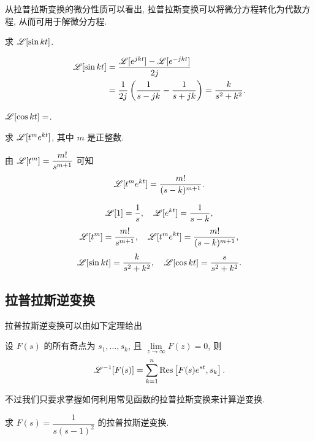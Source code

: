 \documentclass[nocolor,theme=doremi,lang=cn,11pt,chinese,twoside,openright,usesamecnt]{elegantbook}
\newenvironment{block}[1]{\begin{tcolorbox}[blockstyle,title=#1]}{\end{tcolorbox}}
\newenvironment{alertblock}[1]{\begin{tcolorbox}[alertstyle,title=#1]}{\end{tcolorbox}}
\begin{document}
从拉普拉斯变换的微分性质可以看出, 拉普拉斯变换可以将微分方程转化为代数方程, 从而可用于解微分方程.

\begin{example}
	求 $\mathscr{L}[\sin{kt}]$.
\end{example}

\begin{solution}
	\begin{align*}
		\mathscr{L}[\sin{kt}]&=\frac{\mathscr{L}[e^{jkt}]-\mathscr{L}[e^{-jkt}]}{2j}\\
		&=\frac1{2j}\left(\frac1{s-jk}-\frac1{s+jk}\right)
			=\frac k{s^2+k^2}.
	\end{align*}
\end{solution}

\begin{exercise}
	$\mathscr{L}[\cos{kt}]=$.
\end{exercise}

\begin{example}
	求 $\mathscr{L}[t^me^{kt}]$, 其中 $m$ 是正整数.
\end{example}

\begin{solution}
	由 $\mathscr{L}[t^m]=\dfrac{m!}{s^{m+1}}$ 可知
	\[\mathscr{L}[t^me^{kt}]=\frac{m!}{(s-k)^{m+1}}.\]
\end{solution}

\begin{alertblock}{常见拉普拉斯变换汇总}
	\[\mathscr{L}[1]=\frac1s,\quad \mathscr{L}[e^{kt}]=\frac1{s-k},\]
	\[\mathscr{L}[t^m]=\frac{m!}{s^{m+1}},\quad \mathscr{L}[t^me^{kt}]=\frac{m!}{(s-k)^{m+1}},\]
	\[\mathscr{L}[\sin kt]=\frac{k}{s^2+k^2},\quad
	\mathscr{L}[\cos kt]=\frac{s}{s^2+k^2}.\]
\end{alertblock}

\subsection{拉普拉斯逆变换}

拉普拉斯逆变换可以由如下定理给出
\begin{block}{拉普拉斯逆变换定理}
	设 $F(s)$ 的所有奇点为 $s_1,\dots,s_k$, 且 $\lim\limits_{z\to\infty}F(z)=0$, 则
	\[\mathscr{L}^{-1}[F(s)]=\sum_{k=1}^n {\mathrm{Res}}\left[F(s)e^{st},s_k\right].\]
\end{block}

不过我们只要求掌握如何利用常见函数的拉普拉斯变换来计算逆变换.

\begin{example}
	求 $F(s)=\dfrac1{s(s-1)^2}$ 的拉普拉斯逆变换.
\end{example}
\end{document}
